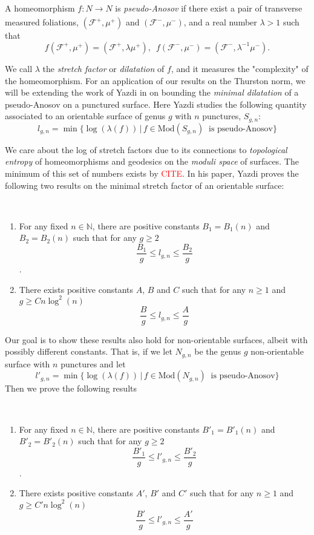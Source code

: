 A homeomorphism $f: N \xrightarrow[]{} N$ is \textit{pseudo-Anosov} if there exist a pair of transverse measured foliations, $(\mathcal{F}^+, \mu^+)$ and $(\mathcal{F}^-, \mu^-)$, and a real number $\lambda > 1$ such that 
$$f(\mathcal{F}^+,\mu^+) = (\mathcal{F}^+,\lambda\mu^+), \,\,\, f(\mathcal{F}^-,\mu^-) = (\mathcal{F}^-,\lambda^{-1}\mu^-).$$

We call $\lambda$ the \textit{stretch factor} or \textit{dilatation} of $f$, and it measures the "complexity" of the homeomorphism. For an application of our results on the Thurston norm, we will be extending the work of Yazdi in \cite{yazdi2018pseudo} on bounding the \textit{minimal dilatation} of a pseudo-Anosov on a punctured surface. Here Yazdi studies the following quantity associated to an orientable surface of genus $g$ with $n$ punctures, $S_{g,n}$:
$$l_{g,n} = \min\{\log(\lambda(f)) \, \vert \, f \in \text{Mod}(S_{g,n})\ \text{ is pseudo-Anosov}\}$$

We care about the log of stretch factors due to its connections to \textit{topological entropy} of homeomorphisms and geodesics on the \textit{moduli space} of surfaces. The minimum of this set of numbers exists by \textcolor{red}{CITE}. In his paper, Yazdi proves the following two results on the minimal stretch factor of an orientable surface:
\begin{thm}[Yazdi]
~\begin{enumerate}
    \item For any fixed $n \in \mathbb{N}$, there are positive constants $B_1 = B_1(n)$ and $B_2 = B_2(n)$ such that for any $g \geq 2$ $$\frac{B_1}{g} \leq l_{g,n} \leq \frac{B_2}{g}$$.
    \item There exists positive constants $A$, $B$ and $C$ such that for any $n \geq 1$ and $g \geq Cn\log^2(n)$ $$\frac{B}{g} \leq l_{g,n} \leq \frac{A}{g}$$
\end{enumerate}

\end{thm}

Our goal is to show these results also hold for non-orientable surfaces, albeit with possibly different constants. That is, if we let $N_{g,n}$ be the genus $g$ non-orientable surface with $n$ punctures and let
$$l'_{g,n} = \min\{\log(\lambda(f)) \, \vert \, f \in \text{Mod}(N_{g,n})\ \text{ is pseudo-Anosov}\}$$
Then we prove the following results
\begin{thm}
~\begin{enumerate}
    \item For any fixed $n \in \mathbb{N}$, there are positive constants $B'_1 = B'_1(n)$ and $B'_2 = B'_2(n)$ such that for any $g \geq 2$ $$\frac{B'_1}{g} \leq l'_{g,n} \leq \frac{B'_2}{g}$$.
    \item There exists positive constants $A'$, $B'$ and $C'$ such that for any $n \geq 1$ and $g \geq C'n\log^2(n)$ $$\frac{B'}{g} \leq l'_{g,n} \leq \frac{A'}{g}$$
\end{enumerate}

\end{thm}

